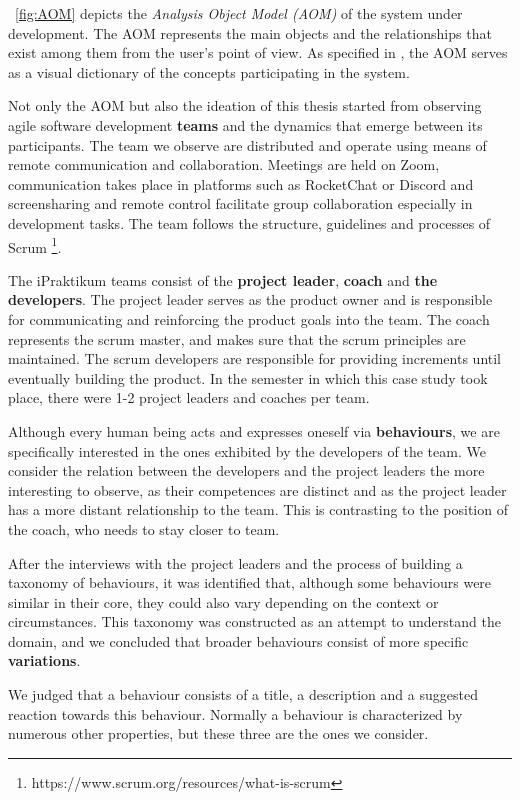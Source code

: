 ~\autoref{fig:AOM} depicts the \textit{Analysis Object Model (AOM)} of the system under development. The AOM represents the main objects and the relationships that exist among them from the user's point of view. As specified in \cite{bruegge2004object}, the AOM serves as a visual dictionary of the concepts participating in the system.

Not only the AOM but also the ideation of this thesis started from observing agile software development \textbf{teams} and the dynamics that emerge between its participants. The team we observe are distributed and operate using means of remote communication and collaboration. Meetings are held on Zoom, communication takes place in platforms such as RocketChat or Discord and screensharing and remote control facilitate group collaboration especially in development tasks. The team follows the structure, guidelines and processes of Scrum \footnote{https://www.scrum.org/resources/what-is-scrum}.

The iPraktikum teams consist of the \textbf{project leader}, \textbf{coach} and \textbf{the developers}. The project leader serves as the product owner and is responsible for communicating and reinforcing the product goals into the team. The coach represents the scrum master, and makes sure that the scrum principles are maintained. The scrum developers are responsible for providing increments until eventually building the product. In the semester in which this case study took place, there were 1-2 project leaders and coaches per team. 

Although every human being acts and expresses oneself via \textbf{behaviours}, we are specifically interested in the ones exhibited by the developers of the team. We consider the relation between the developers and the project leaders the more interesting to observe, as their competences are distinct and as the project leader has a more distant relationship to the team. This is contrasting to the position of the coach, who needs to stay closer to team.

After the interviews with the project leaders and the process of building a taxonomy of behaviours, it was identified that, although some behaviours were similar in their core, they could also vary depending on the context or circumstances. This taxonomy was constructed as an attempt to understand the domain, and we concluded that broader behaviours consist of more specific \textbf{variations}.

We judged that a behaviour consists of a title, a description and a suggested reaction towards this behaviour. Normally a behaviour is characterized by numerous other properties, but these three are the ones we consider.

